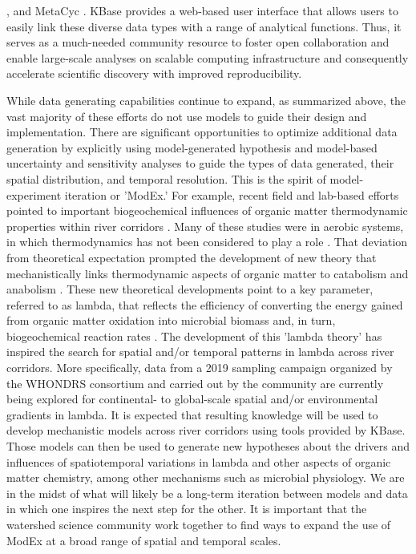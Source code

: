 \documentclass[preprint,review, 12pt]{elsarticle}
\begin{document}
\citep{Schellenberger2010}, and MetaCyc \citep{Caspi2006}. KBase provides a web-based user interface that allows users to easily link these diverse data types with a range of analytical functions. Thus, it serves as a much-needed community resource to foster open collaboration and enable large-scale analyses on scalable computing infrastructure and consequently accelerate scientific discovery with improved reproducibility.

While data generating capabilities continue to expand, as summarized above, the vast majority of these efforts do not use models to guide their design and implementation. There are significant opportunities to optimize additional data generation by explicitly using model-generated hypothesis and model-based uncertainty and sensitivity analyses to guide the types of data generated, their spatial distribution, and temporal resolution. This is the spirit of model-experiment iteration or 'ModEx.' For example, recent field and lab-based efforts pointed to important biogeochemical influences of organic matter thermodynamic properties within river corridors \citep{Stegen2018,Graham2018,Graham2017d,Garayburu-Caruso2020,Boye2017}. Many of these studies were in aerobic systems, in which thermodynamics has not been considered to play a role \citep{jin_new_2003}. That deviation from theoretical expectation prompted the development of new theory that mechanistically links thermodynamic aspects of organic matter to catabolism and anabolism \citep{song_representing_2020}. These new theoretical developments point to a key parameter, referred to as lambda, that reflects the efficiency of converting the energy gained from organic matter oxidation into microbial biomass and, in turn, biogeochemical reaction rates \citep{song_representing_2020}. The development of this 'lambda theory' has inspired the search for spatial and/or temporal patterns in lambda across river corridors. More specifically, data from a 2019 sampling campaign organized by the WHONDRS consortium \citep{stegen_whondrs_2018,WHONDRS_S19S_DATA} and carried out by the community are currently being explored for continental- to global-scale spatial and/or environmental gradients in lambda. It is expected that resulting knowledge will be used to develop mechanistic models across river corridors using tools provided by KBase. Those models can then be used to generate new hypotheses about the drivers and influences of spatiotemporal variations in lambda and other aspects of organic matter chemistry, among other mechanisms such as microbial physiology. We are in the midst of what will likely be a long-term iteration between models and data in which one inspires the next step for the other. It is important that the watershed science community work together to find ways to expand the use of ModEx at a broad range of spatial and temporal scales.
\end{document}
